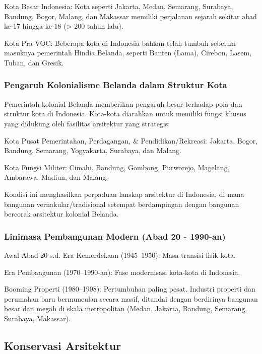 \documentclass[../rumukota.tex]{subfiles}
\begin{document}
Kota Besar Indonesia: Kota seperti Jakarta, Medan, Semarang, Surabaya, Bandung, Bogor, Malang, dan Makassar memiliki perjalanan sejarah sekitar abad ke-17 hingga ke-18 (> 200 tahun lalu).

Kota Pra-VOC: Beberapa kota di Indonesia bahkan telah tumbuh sebelum masuknya pemerintah Hindia Belanda, seperti Banten (Lama), Cirebon, Lasem, Tuban, dan Gresik.

\subsubsection{Pengaruh Kolonialisme Belanda dalam Struktur Kota}%
\label{sub:pengaruh_kolonialisme_belanda_dalam_struktur_kota}

Pemerintah kolonial Belanda memberikan pengaruh besar terhadap pola dan struktur kota di Indonesia. Kota-kota diarahkan untuk memiliki fungsi khusus yang didukung oleh fasilitas arsitektur yang strategis:

Kota Pusat Pemerintahan, Perdagangan, \& Pendidikan/Rekreasi: Jakarta, Bogor, Bandung, Semarang, Yogyakarta, Surabaya, dan Malang.

Kota Fungsi Militer: Cimahi, Bandung, Gombong, Purworejo, Magelang, Ambarawa, Madiun, dan Malang.

Kondisi ini menghasilkan perpaduan lanskap arsitektur di Indonesia, di mana bangunan vernakular/tradisional setempat berdampingan dengan bangunan bercorak arsitektur kolonial Belanda.

\subsubsection{Linimasa Pembangunan Modern (Abad 20 - 1990-an)}%
\label{sub:linimasa_pembangunan_modern_(abad_20_-_1990-an)}

Awal Abad 20 s.d. Era Kemerdekaan (1945–1950): Masa transisi fisik kota.

Era Pembangunan (1970–1990-an): Fase modernisasi kota-kota di Indonesia.

Booming Properti (1980–1998): Pertumbuhan paling pesat. Industri properti dan perumahan baru bermunculan secara masif, ditandai dengan berdirinya bangunan besar dan megah di skala metropolitan (Medan, Jakarta, Bandung, Semarang, Surabaya, Makassar).

\subsection{Konservasi Arsitektur}%
\label{sub:konservasi_arsitektur}
\end{document}
